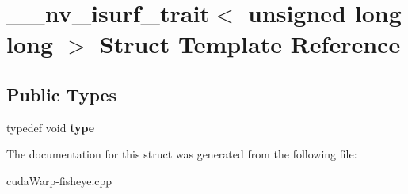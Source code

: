 \hypertarget{struct____nv__isurf__trait_3_01unsigned_01long_01long_01_4}{}\section{\+\_\+\+\_\+nv\+\_\+isurf\+\_\+trait$<$ unsigned long long $>$ Struct Template Reference}
\label{struct____nv__isurf__trait_3_01unsigned_01long_01long_01_4}
\subsection*{Public Types}
\begin{DoxyCompactItemize}
\item 
typedef void {\bfseries type}\hypertarget{struct____nv__isurf__trait_3_01unsigned_01long_01long_01_4_a175bde2317f46d3f3feea31ac0878d40}{}\label{struct____nv__isurf__trait_3_01unsigned_01long_01long_01_4_a175bde2317f46d3f3feea31ac0878d40}

\end{DoxyCompactItemize}


The documentation for this struct was generated from the following file\+:\begin{DoxyCompactItemize}
\item 
cuda\+Warp-\/fisheye.\+cpp\end{DoxyCompactItemize}
